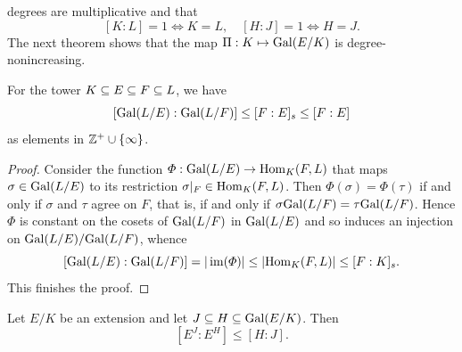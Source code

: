degrees are multiplicative and that
\[[K:L]=1\Leftrightarrow K=L,\quad [H:J]=1\Leftrightarrow H=J.\]
The next theorem shows that the map $\Pi:K\mapsto\mathrm{Gal}(E/K)$ is degree-nonincreasing.
\begin{proposition}\label{Galois correspondence degree noninceasing: field}
For the tower $K\subseteq E\subseteq F\subseteq L$, we have
\[[\mathrm{Gal}(L/E):\mathrm{Gal}(L/F)]\leq[F:E]_s\leq[F:E]\]
as elements in $\mathbb{Z}^+\cup\{\infty\}$.
\end{proposition}
\begin{proof}
Consider the function $\varPhi:\mathrm{Gal}(L/E)\to\mathrm{Hom}_K(F,L)$ that maps $\sigma\in\mathrm{Gal}(L/E)$ to its restriction $\sigma|_F\in\mathrm{Hom}_K(F,L)$. Then $\varPhi(\sigma)=\varPhi(\tau)$ if and only if $\sigma$ and $\tau$ agree on $F$, that is, if and only if $\sigma\mathrm{Gal}(L/F)=\tau\mathrm{Gal}(L/F)$. Hence $\varPhi$ is constant on the cosets of $\mathrm{Gal}(L/F)$ in $\mathrm{Gal}(L/E)$ and so induces an injection on $\mathrm{Gal}(L/E)/\mathrm{Gal}(L/F)$, whence
\[[\mathrm{Gal}(L/E):\mathrm{Gal}(L/F)]=|\operatorname{im}(\varPhi)|\leq|\mathrm{Hom}_K(F,L)|\leq[F:K]_s.\]
This finishes the proof.
\end{proof}
\begin{proposition}\label{Galois correspondence degree noninceasing: group}
Let $E/K$ be an extension and let $J\subseteq H\subseteq\mathrm{Gal}(E/K)$. Then
\[[E^J:E^H]\leq[H:J].\]
\end{proposition}
